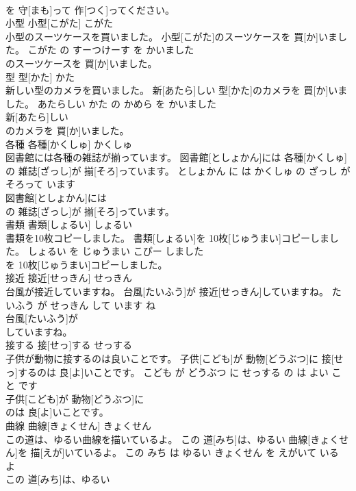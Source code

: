 \documentclass[8pt]{extreport}
\begin{document}
\begin{CJK}{UTF8}{min}
\\	を 守[まも]って 作[つく]ってください。			
\\	小型	小型[こがた]	こがた	
\\	小型のスーツケースを買いました。	小型[こがた]のスーツケースを 買[か]いました。	こがた の すーつけーす を かいました	
\\	のスーツケースを 買[か]いました。			
\\	型	型[かた]	かた	
\\	新しい型のカメラを買いました。	新[あたら]しい 型[かた]のカメラを 買[か]いました。	あたらしい かた の かめら を かいました	
\\	新[あたら]しい
\\	のカメラを 買[か]いました。			
\\	各種	各種[かくしゅ]	かくしゅ	
\\	図書館には各種の雑誌が揃っています。	図書館[としょかん]には 各種[かくしゅ]の 雑誌[ざっし]が 揃[そろ]っています。	としょかん に は かくしゅ の ざっし が そろって います	
\\	図書館[としょかん]には
\\	の 雑誌[ざっし]が 揃[そろ]っています。			
\\	書類	書類[しょるい]	しょるい	
\\	書類を10枚コピーしました。	書類[しょるい]を 10枚[じゅうまい]コピーしました。	しょるい を じゅうまい こぴー しました	
\\	を 10枚[じゅうまい]コピーしました。			
\\	接近	接近[せっきん]	せっきん	
\\	台風が接近していますね。	台風[たいふう]が 接近[せっきん]していますね。	たいふう が せっきん して います ね	
\\	台風[たいふう]が
\\	していますね。			
\\	接する	接[せっ]する	せっする	
\\	子供が動物に接するのは良いことです。	子供[こども]が 動物[どうぶつ]に 接[せっ]するのは 良[よ]いことです。	こども が どうぶつ に せっする の は よい こと です	
\\	子供[こども]が 動物[どうぶつ]に
\\	のは 良[よ]いことです。			
\\	曲線	曲線[きょくせん]	きょくせん	
\\	この道は、ゆるい曲線を描いているよ。	この 道[みち]は、ゆるい 曲線[きょくせん]を 描[えが]いているよ。	この みち は ゆるい きょくせん を えがいて いる よ	
\\	この 道[みち]は、ゆるい

\end{CJK}
\end{document}
